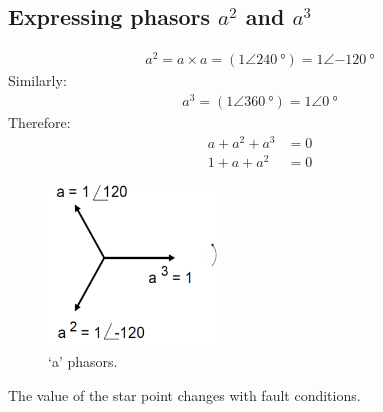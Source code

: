\documentclass[class=report, crop=false, 12pt,a4paper]{standalone}
\begin{document}
\subsection{Expressing phasors $a^2$ and $a^3$}
\begin{gather}
	a^2 = a \times a = \left(1 \angle \SI{240}{\degree}\right) = 1 \angle \SI{-120}{\degree}
\end{gather}
Similarly:
\begin{gather}
	a^3 = \left( 1 \angle \SI{360}{\degree}\right) = 1 \angle \SI{0}{\degree}
\end{gather}
Therefore:
\begin{align}
	a + a^2 + a^3 &= 0\\
	1 + a + a^2 &= 0
\end{align}
\begin{figure}[H]
	\centering
	\includegraphics[width = 0.4\textwidth]{../img/figure28.png}
	\caption{`a' phasors.}
\end{figure}
The value of the star point changes with fault conditions.
\end{document}
